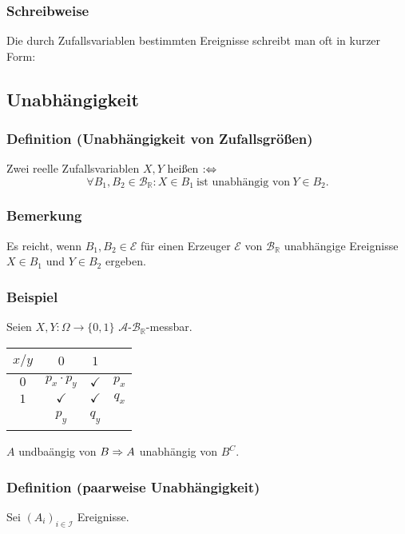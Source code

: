 \subsubsection{Schreibweise}
Die durch Zufallsvariablen bestimmten Ereignisse schreibt man oft in kurzer Form:
\subsection{Unabh\"angigkeit}
\subsubsection{Definition (Unabh\"angigkeit von Zufallsgr\"o\ss{}en)}
Zwei reelle Zufallsvariablen $X,Y$ hei\ss{}en  $:\Leftrightarrow$
\[\forall B_1,B_2\in\mathcal{B}_\mathbb{R}\colon X\in B_1\ \text{ist unabh\"angig von}\ Y\in B_2.\]
\subsubsection{Bemerkung}
Es reicht, wenn $B_1,B_2\in\mathcal{E}$ f\"ur einen Erzeuger $\mathcal{E}$ von $\mathcal{B}_\mathbb{R}$ unabh\"angige Ereignisse $X\in B_1$ und $Y\in B_2$ ergeben.
\subsubsection{Beispiel}
Seien $X,Y\colon\Omega\to\{0,1\}$ $\mathcal{A}$-$\mathcal{B}_\mathbb{R}$-messbar.
\begin{center}
\begin{tabular}{c|c|c|c}
$x/y$&$0$&$1$&~\\
\hline
$0$&$p_x\cdot p_y$&$\checkmark$&$p_x$\\
\hline
$1$&$\checkmark$&$\checkmark$&$q_x$\\
\hline
~&$p_y$&$q_y$&~
\end{tabular}
\end{center}
$A$ undba\"angig von $B\Rightarrow A$ unabh\"angig von $B^C$.
\subsubsection{Definition (paarweise Unabh\"angigkeit)}
Sei $(A_i)_{i\in\mathcal{I}}$ Ereignisse.
